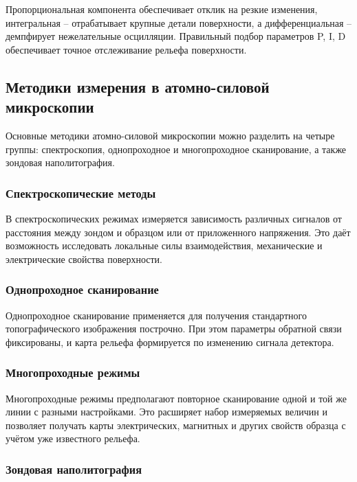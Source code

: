 \documentclass[a4paper,12pt]{article}
\begin{document}
Пропорциональная компонента обеспечивает отклик на резкие изменения, интегральная -- отрабатывает крупные детали поверхности, а дифференциальная -- демпфирует нежелательные осцилляции. Правильный подбор параметров P, I, D обеспечивает точное отслеживание рельефа поверхности.

\subsection{Методики измерения в атомно-силовой микроскопии}

Основные методики атомно-силовой микроскопии можно разделить на четыре группы: спектроскопия, однопроходное и многопроходное сканирование, а также зондовая наполитография.

\subsubsection{Спектроскопические методы}

В спектроскопических режимах измеряется зависимость различных сигналов от расстояния между зондом и образцом или от приложенного напряжения. Это даёт возможность исследовать локальные силы взаимодействия, механические и электрические свойства поверхности.

\subsubsection{Однопроходное сканирование}

Однопроходное сканирование применяется для получения стандартного топографического изображения построчно. При этом параметры обратной связи фиксированы, и карта рельефа формируется по изменению сигнала детектора.

\subsubsection{Многопроходные режимы}

Многопроходные режимы предполагают повторное сканирование одной и той же линии с разными настройками. Это расширяет набор измеряемых величин и позволяет получать карты электрических, магнитных и других свойств образца с учётом уже известного рельефа.

\subsubsection{Зондовая наполитография}
\end{document}
